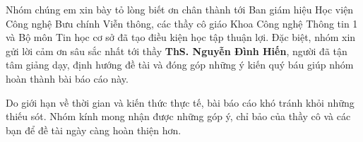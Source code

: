 Nhóm chúng em xin bày tỏ lòng biết ơn chân thành tới Ban giám hiệu Học viện Công nghệ Bưu chính Viễn thông, các thầy cô giáo Khoa Công nghệ Thông tin 1 và Bộ môn Tin học cơ sở đã tạo điều kiện học tập thuận lợi. Đặc biệt, nhóm xin gửi lời cảm ơn sâu sắc nhất tới thầy \textbf{ThS. Nguyễn Đình Hiến}, người đã tận tâm giảng dạy, định hướng đề tài và đóng góp những ý kiến quý báu giúp nhóm hoàn thành bài báo cáo này.

Do giới hạn về thời gian và kiến thức thực tế, bài báo cáo khó tránh khỏi những thiếu sót. Nhóm kính mong nhận được những góp ý, chỉ bảo của thầy cô và các bạn để đề tài ngày càng hoàn thiện hơn.
